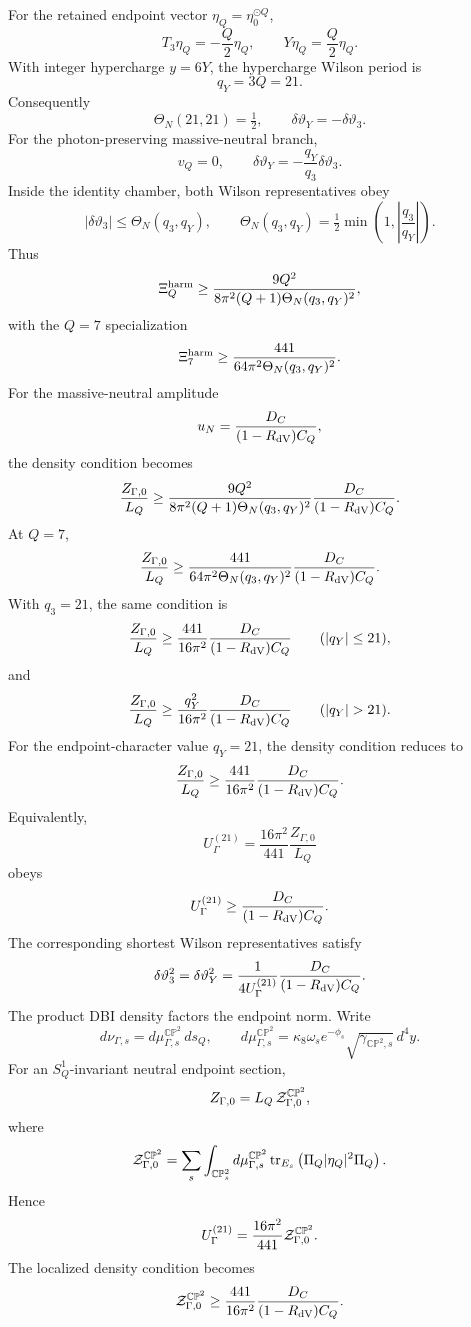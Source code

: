 \documentclass[11pt]{article}
\theoremstyle{definition}
\theoremstyle{remark}
\newcommand{\CP}{\mathbb{CP}}
\newcommand{\half}{\tfrac12}
\begin{document}
For the retained endpoint vector \(\eta_Q=\eta_0^{\odot Q}\),
\[
  T_3\eta_Q=-\frac Q2\eta_Q,
  \qquad
  Y\eta_Q=\frac Q2\eta_Q .
\]
With integer hypercharge \(y=6Y\), the hypercharge Wilson period is
\[
  q_Y=3Q=21 .
\]
Consequently
\[
  \Theta_N(21,21)=\half,
  \qquad
  \delta\vartheta_Y=-\delta\vartheta_3 .
\]
For the photon-preserving massive-neutral branch,
\[
  v_Q=0,
  \qquad
  \delta\vartheta_Y=-\frac{q_Y}{q_3}\delta\vartheta_3 .
\]
Inside the identity chamber, both Wilson representatives obey
\[
  |\delta\vartheta_3|\le\Theta_N(q_3,q_Y),
  \qquad
  \Theta_N(q_3,q_Y)
  =
  \half\min\left(1,\left|\frac{q_3}{q_Y}\right|\right).
\]
Thus
\[
  \Xi_Q^{\rm harm}
  \ge
  \frac{9Q^2}{8\pi^2(Q+1)\Theta_N(q_3,q_Y)^2},
\]
with the \(Q=7\) specialization
\[
  \Xi_7^{\rm harm}
  \ge
  \frac{441}{64\pi^2\Theta_N(q_3,q_Y)^2}.
\]
For the massive-neutral amplitude
\[
  u_N=\frac{D_C}{(1-R_{\rm dV})C_Q},
\]
the density condition becomes
\[
  \frac{Z_{\Gamma,0}}{L_Q}
  \ge
  \frac{9Q^2}{8\pi^2(Q+1)\Theta_N(q_3,q_Y)^2}
  \frac{D_C}{(1-R_{\rm dV})C_Q}.
\]
At \(Q=7\),
\[
  \frac{Z_{\Gamma,0}}{L_Q}
  \ge
  \frac{441}{64\pi^2\Theta_N(q_3,q_Y)^2}
  \frac{D_C}{(1-R_{\rm dV})C_Q}.
\]
With \(q_3=21\), the same condition is
\[
  \frac{Z_{\Gamma,0}}{L_Q}
  \ge
  \frac{441}{16\pi^2}
  \frac{D_C}{(1-R_{\rm dV})C_Q}
  \qquad (|q_Y|\le21),
\]
and
\[
  \frac{Z_{\Gamma,0}}{L_Q}
  \ge
  \frac{q_Y^2}{16\pi^2}
  \frac{D_C}{(1-R_{\rm dV})C_Q}
  \qquad (|q_Y|>21).
\]
For the endpoint-character value \(q_Y=21\), the density condition reduces to
\[
  \frac{Z_{\Gamma,0}}{L_Q}
  \ge
  \frac{441}{16\pi^2}
  \frac{D_C}{(1-R_{\rm dV})C_Q}.
\]
Equivalently,
\[
  U_\Gamma^{(21)}
  =
  \frac{16\pi^2}{441}\frac{Z_{\Gamma,0}}{L_Q}
\]
obeys
\[
  U_\Gamma^{(21)}
  \ge
  \frac{D_C}{(1-R_{\rm dV})C_Q}.
\]
The corresponding shortest Wilson representatives satisfy
\[
  \delta\vartheta_3^2
  =
  \delta\vartheta_Y^2
  =
  \frac{1}{4U_\Gamma^{(21)}}
  \frac{D_C}{(1-R_{\rm dV})C_Q}.
\]
The product DBI density factors the endpoint norm.  Write
\[
  d\nu_{\Gamma,s}
  =
  d\mu_{\Gamma,s}^{\CP^2}\,ds_Q,
  \qquad
  d\mu_{\Gamma,s}^{\CP^2}
  =
  \kappa_8\omega_se^{-\phi_s}
  \sqrt{\gamma_{\CP^2,s}}\,d^4y .
\]
For an \(S^1_Q\)-invariant neutral endpoint section,
\[
  Z_{\Gamma,0}
  =
  L_Q\,{\cal Z}_{\Gamma,0}^{\CP^2},
\]
where
\[
  {\cal Z}_{\Gamma,0}^{\CP^2}
  =
  \sum_s
  \int_{\CP^2_s}d\mu_{\Gamma,s}^{\CP^2}\,
  {\rm tr}_{E_s}\left(\Pi_Q|\eta_Q|^2\Pi_Q\right).
\]
Hence
\[
  U_\Gamma^{(21)}
  =
  \frac{16\pi^2}{441}{\cal Z}_{\Gamma,0}^{\CP^2}.
\]
The localized density condition becomes
\[
  {\cal Z}_{\Gamma,0}^{\CP^2}
  \ge
  \frac{441}{16\pi^2}
  \frac{D_C}{(1-R_{\rm dV})C_Q}.
\]
\end{document}
